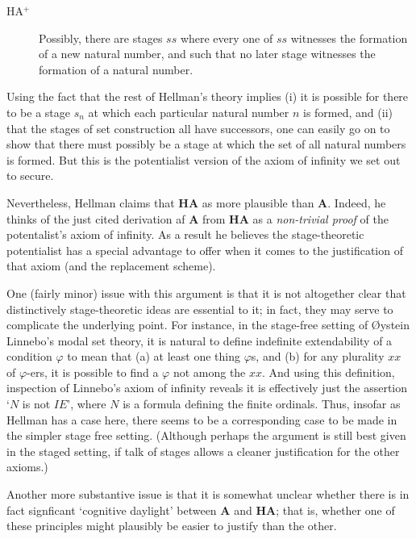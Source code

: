\documentclass{amsart}
\theoremstyle{definition}
\begin{document}
\begin{description}
    \item[HA$^+$] Possibly, there are stages $ss$ 
    where every one of $ss$ witnesses the formation of a new natural number, 
    and such that no later stage witnesses the formation of a natural number.
\end{description}

Using the fact that the rest of Hellman's theory implies (i)
it is possible for there to be a stage $s_n$ at which 
each particular natural number $n$ is formed, and (ii) that the 
stages of set construction all have successors,
one can easily go on to show that there must possibly be a stage 
at which the set of all natural numbers is formed.
But this is the potentialist version of the axiom of infinity we 
set out to secure.

Nevertheless, Hellman claims that {\bf HA} as more plausible than {\bf A}.
Indeed, he thinks of the just cited derivation af {\bf A} from {\bf HA}
as a \emph{non-trivial proof} of the potentalist's axiom of infinity. 
As a result he believes the stage-theoretic potentialist has a 
special advantage to offer when it comes to 
the justification of that axiom (and the replacement scheme).

One (fairly minor) issue with this argument is that it is not altogether clear
that distinctively stage-theoretic ideas are essential to it; 
in fact, they may serve to complicate the underlying point.
For instance, in the stage-free setting of \O ystein Linnebo's modal 
set theory, it is natural to define indefinite extendability of a condition 
$\varphi$ to mean that (a) at least one thing $\varphi$s, and (b) for any 
plurality $xx$ of $\varphi$-ers, it is possible to find a $\varphi$ not among 
the $xx$. And using this definition, inspection of Linnebo's axiom of infinity 
reveals it is effectively just the assertion `$N$ is not $IE$', where $N$ is a
formula defining the finite ordinals. Thus, insofar as Hellman has a case here,
there seems to be a corresponding case to be made in the simpler stage free setting.
(Although perhaps the argument is still best given in the staged setting, 
if talk of stages allows a cleaner justification for the other axioms.)

Another more substantive issue is that it is somewhat unclear whether 
there is in fact signficant `cognitive daylight' between 
{\bf A} and {\bf HA}; that is, whether one of these principles might plausibly 
be easier to justify than the other.
\end{document}
